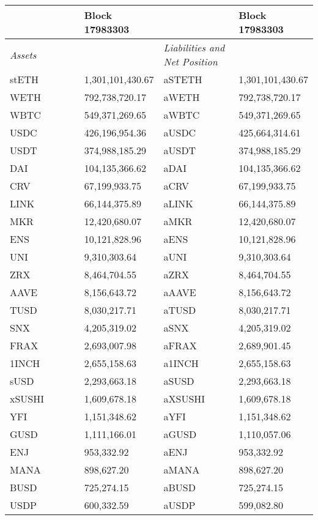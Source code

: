 
\begin{longtable}{@{}p{0.25\linewidth}p{0.25\linewidth}p{0.25\linewidth}p{0.25\linewidth}@{}}

\toprule


& Block 17983303 & & Block 17983303 \\

\midrule
\textit{Assets} & & \textit{Liabilities and Net Position} \\
stETH & 1,301,101,430.67 & aSTETH & 1,301,101,430.67 \\
WETH & 792,738,720.17 & aWETH & 792,738,720.17 \\
WBTC & 549,371,269.65 & aWBTC & 549,371,269.65 \\
USDC & 426,196,954.36 & aUSDC & 425,664,314.61 \\
USDT & 374,988,185.29 & aUSDT & 374,988,185.29 \\
DAI & 104,135,366.62 & aDAI & 104,135,366.62 \\
CRV & 67,199,933.75 & aCRV & 67,199,933.75 \\
LINK & 66,144,375.89 & aLINK & 66,144,375.89 \\
MKR & 12,420,680.07 & aMKR & 12,420,680.07 \\
ENS & 10,121,828.96 & aENS & 10,121,828.96 \\
UNI & 9,310,303.64 & aUNI & 9,310,303.64 \\
ZRX & 8,464,704.55 & aZRX & 8,464,704.55 \\
AAVE & 8,156,643.72 & aAAVE & 8,156,643.72 \\
TUSD & 8,030,217.71 & aTUSD & 8,030,217.71 \\
SNX & 4,205,319.02 & aSNX & 4,205,319.02 \\
FRAX & 2,693,007.98 & aFRAX & 2,689,901.45 \\
1INCH & 2,655,158.63 & a1INCH & 2,655,158.63 \\
sUSD & 2,293,663.18 & aSUSD & 2,293,663.18 \\
xSUSHI & 1,609,678.18 & aXSUSHI & 1,609,678.18 \\
YFI & 1,151,348.62 & aYFI & 1,151,348.62 \\
GUSD & 1,111,166.01 & aGUSD & 1,110,057.06 \\
ENJ & 953,332.92 & aENJ & 953,332.92 \\
MANA & 898,627.20 & aMANA & 898,627.20 \\
BUSD & 725,274.15 & aBUSD & 725,274.15 \\
USDP & 600,332.59 & aUSDP & 599,082.80 \\

\end{longtable}
